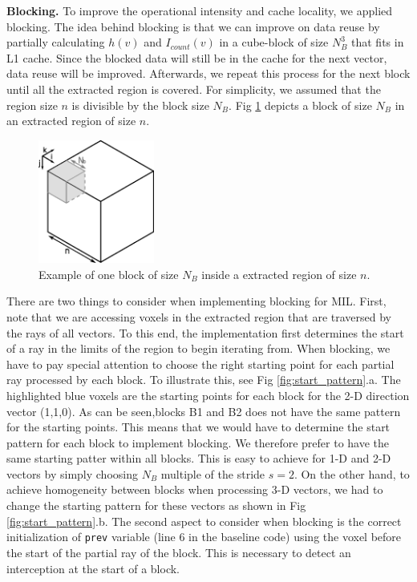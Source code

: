 \documentclass[letterpaper]{article}
\newcommand{\mypar}[1]{{\bf #1.}}
\begin{document}
\mypar{Blocking}
To improve the operational intensity and cache locality, we applied blocking. The idea behind blocking is that we can improve on data reuse by partially calculating $h(v)$ and $I_{count}(v)$ in a cube-block of size $N_B^3$ that fits in L1 cache. Since the blocked data will still be in the cache for the next vector, data reuse will be improved. Afterwards, we repeat this process for the next block until all the extracted region is covered. For simplicity, we assumed that the region size $n$ is divisible by the block size $N_B$. Fig \ref{fig:mil_blocking} depicts a block of size $N_B$ in an extracted region of size $n$. 


\begin{figure}[h]
    \centering
    \includegraphics[width=1.5in]{figs/mil_blocking_2.eps}
    \caption {Example of one block of size $N_B$ inside a extracted region of size $n$.}
    \label{fig:mil_blocking}
\end{figure}

There are two things to consider when implementing blocking for MIL. First, note that we are accessing voxels in the extracted region that are traversed by the rays of all vectors. To this end, the implementation first determines the start of a ray in the limits of the region to begin iterating from. When blocking, we have to pay special attention to choose the right starting point for each partial ray processed by each block. To illustrate this, see Fig \ref{fig:start_pattern}.a. The highlighted blue voxels are the starting points for each block for the 2-D direction vector (1,1,0). As can be seen,blocks B1 and B2 does not have the same pattern for the starting points. This means that we would have to determine the start pattern for each block to implement blocking. We therefore prefer to have the same starting patter within all blocks. This is easy to achieve for 1-D and 2-D vectors by simply choosing $N_B$ multiple of the stride $s=2$. On the other hand, to achieve homogeneity between blocks when processing 3-D vectors, we had to change the starting pattern for these vectors as shown in Fig \ref{fig:start_pattern}.b. The second aspect to consider when blocking is the correct initialization of \texttt{prev} variable (line 6 in the baseline code) using the voxel before the start of the partial ray of the block. This is necessary to detect an interception at the start of a block. 
\end{document}
